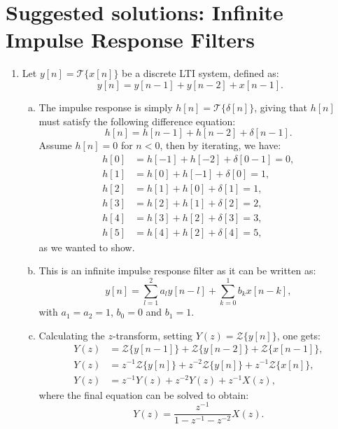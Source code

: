 
\newpage
\section{Suggested solutions: Infinite Impulse Response Filters}

\begin{enumerate}
    \item Let $y[n]=\mathcal{T}\{x[n]\}$ be a discrete LTI system, defined as:
          \[y[n]=y[n-1]+y[n-2]+x[n-1].\]

          \begin{enumerate}[a)]
              \item The impulse response is simply $h[n]=\mathcal{T}\{\delta[n]\}$, giving that $h[n]$ must satisfy the following difference equation:
                    \[h[n]=h[n-1]+h[n-2]+\delta[n-1].\]
                    Assume $h[n]=0$ for $n<0$, then by iterating, we have:
                    \begin{align*}
                        h[0] & = h[-1] + h[-2] + \delta[0-1]=0, \\
                        h[1] & = h[0]  + h[-1] + \delta[0]=1,   \\
                        h[2] & = h[1]  + h[0]  + \delta[1]=1,   \\
                        h[3] & = h[2]  + h[1]  + \delta[2]=2,   \\
                        h[4] & = h[3]  + h[2]  + \delta[3]=3,   \\
                        h[5] & = h[4]  + h[2]  + \delta[4]=5,
                    \end{align*}
                    as we wanted to show.
              \item This is an infinite impulse response filter as it can be written as:
                    \[y[n]=\sum_{l=1}^{2} a_{l}y[n-l]+\sum_{k=0}^{1} b_{k}x[n-k],\]
                    with $a_{1}=a_{2}=1$, $b_{0}=0$ and $b_{1}=1$.

              \item Calculating the $z$-transform, setting $Y(z) = \mathcal{Z}\{y[n]\}$, one gets:
                    \begin{align*}
                        Y(z) & =\mathcal{Z}\{y[n-1]\}+\mathcal{Z}\{y[n-2]\}+\mathcal{Z}\{x[n-1]\},                 \\
                        Y(z) & =z^{-1}\mathcal{Z}\{y[n]\} + z^{-2}\mathcal{Z}\{y[n]\} + z^{-1}\mathcal{Z}\{x[n]\}, \\
                        Y(z) & =z^{-1}Y(z) + z^{-2}Y(z) + z^{-1}X(z),
                    \end{align*}
                    where the final equation can be solved to obtain:
                    $$Y(z)=\frac{z^{-1}}{1-z^{-1}-z^{-2}}X(z).$$


\end{enumerate}
\end{enumerate}
